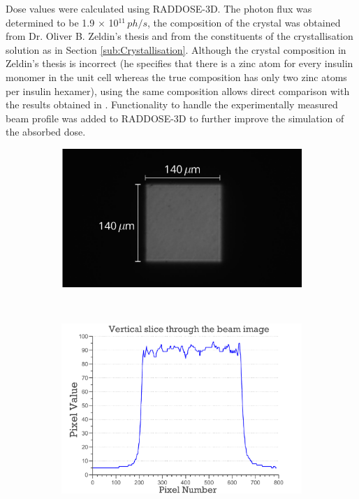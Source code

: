 Dose values were calculated using RADDOSE-3D.
The photon flux was determined to be 1.9 $\times$ 10$^{\text{11}}\,ph/s$, the composition of the crystal was obtained from Dr. Oliver B. Zeldin's thesis \cite{zeldin2013thesis} and from the constituents of the crystallisation solution as in Section \ref{sub:Crystallisation}.
Although the crystal composition in Zeldin's thesis is incorrect (he specifies that there is a zinc atom for every insulin monomer in the unit cell whereas the true composition has only two zinc atoms per insulin hexamer), using the same composition allows direct comparison with the results obtained in \cite{zeldin2013dwd}.
Functionality to handle the experimentally measured beam profile was added to RADDOSE-3D to further improve the simulation of the absorbed dose.
\begin{figure}
        \centering
        \begin{subfigure}[b]{1\textwidth}
                \centering
                \includegraphics[width=\textwidth]{figures/dwd/hamburg_beampgm.pdf}
                \caption{}
                \label{fig: Hamburg beam PGM}
        \end{subfigure}
				\\
        \begin{subfigure}[b]{1\textwidth}
                \centering
                \includegraphics[width=\textwidth]{figures/dwd/beamslice.pdf}
                \caption{}
                \label{fig:Hamburg beamslice}
        \end{subfigure}
\end{figure}
